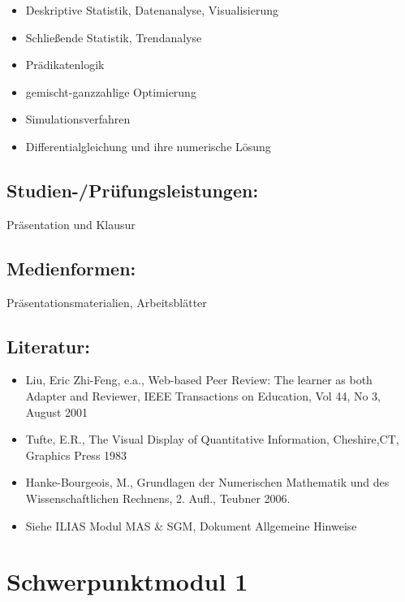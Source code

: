 \begin{itemize}
\tightlist
\item
  Deskriptive Statistik, Datenanalyse, Visualisierung
\item
  Schließende Statistik, Trendanalyse
\item
  Prädikatenlogik
\item
  gemischt-ganzzahlige Optimierung
\item
  Simulationsverfahren
\item
  Differentialgleichung und ihre numerische Lösung
\end{itemize}

\section*{Studien-/Prüfungsleistungen:}\label{studien-pruxfcfungsleistungen-2}

Präsentation und Klausur

\section*{Medienformen:}\label{medienformen-2}

Präsentationsmaterialien, Arbeitsblätter

\section*{Literatur:}\label{literatur-2}

\begin{itemize}
\tightlist
\item
  Liu, Eric Zhi-Feng, e.a., Web-based Peer Review: The learner as both
  Adapter and Reviewer, IEEE Transactions on Education, Vol 44, No 3,
  August 2001
\item
  Tufte, E.R., The Visual Display of Quantitative Information,
  Cheshire,CT, Graphics Press 1983
\item
  Hanke-Bourgeois, M., Grundlagen der Numerischen Mathematik und des
  Wissenschaftlichen Rechnens, 2. Aufl., Teubner 2006.
\item
  Siehe ILIAS Modul MAS \& SGM, Dokument Allgemeine Hinweise
\end{itemize}

\chapter{Schwerpunktmodul 1}\label{schwerpunktmodul-1}

